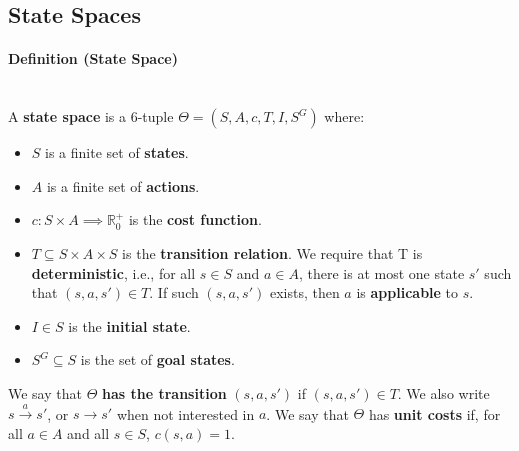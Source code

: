 \documentclass[conference]{styles/acmsiggraph}
\newcommand\subsubsubsection{\paragraph}
\begin{document}
    \subsection{State Spaces}
        \subsubsubsection{Definition (State Space)}\ \\
            A \textbf{state space} is a 6-tuple $\Theta = (S,A,c,T,I,S^G)$ where:
            \begin{itemize}
                \item $S$ is a finite set of \textbf{states}.
                \item $A$ is a finite set of \textbf{actions}.
                \item $c : S \times A \implies \mathbb{R}^+_0$ is the \textbf{cost function}.
                \item $T \subseteq S \times A \times S$ is the \textbf{transition relation}.
                    We require that T is \textbf{deterministic}, i.e., for all $s \in S$ and $a \in A$, there is at most one state $s'$ such that $(s,a,s') \in T$.
                    If such $(s,a,s')$ exists, then $a$ is \textbf{applicable} to $s$.
                \item $I \in S$ is the \textbf{initial state}.
                \item $S^G \subseteq S$ is the set of \textbf{goal states}.
            \end{itemize}
            

        We say that $\Theta$ \textbf{has the transition} $(s,a,s')$ if $(s,a,s') \in T$.
        We also write $s \xrightarrow{a} s'$, or $s \rightarrow s'$ when not interested in $a$.
        We say that $\Theta$ has \textbf{unit costs} if, for all $a \in A$ and all $s \in S$, $c(s,a)=1$.
        
\end{document}
